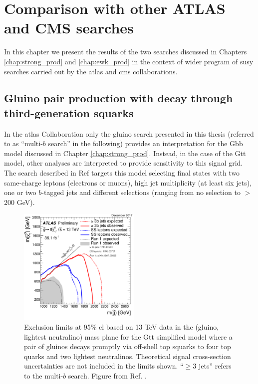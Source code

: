 \chapter{Comparison with other ATLAS and CMS searches}
\label{chap:summary_susy}

In this chapter we present the results of the two searches discussed in Chapters \ref{chap:strong_prod} and \ref{chap:ewk_prod} in the context of
wider program of \gls{susy} searches carried out by the \gls{atlas} and \gls{cms} collaborations. 

\section{Gluino pair production with decay through third-generation squarks}

In the \gls{atlas} Collaboration only the gluino search presented in this thesis (referred to as ``multi-$b$ search'' in the following) 
provides an interpretation for the Gbb model 
discussed in Chapter \ref{chap:strong_prod}.
Instead, in the case of the Gtt model, other analyses 
are interpreted to provide sensitivity  to this 
signal grid. 
The search described in Ref \cite{Aaboud:2017dmy} targets this model selecting final states with two same-charge 
leptons (electrons or muons), high jet multiplicity (at least six jets), one or two $b$-tagged jets and different \met selections 
(ranging from no \met selection to \met $>$ 200 GeV).

\begin{figure}[htbp]
	\centering
	\includegraphics[width=0.52\textwidth]{figures/summary_plots/ATLAS_SUSY_Gtt.pdf}
	\caption{Exclusion limits at 95\% \gls{cl} based on 13 TeV data in the (gluino, lightest neutralino) 
	mass plane for the Gtt simplified model where a pair of gluinos decays promptly via off-shell top 
	squarks to four top quarks and two lightest neutralinos. Theoretical signal cross-section uncertainties are 
	not included in the limits shown. ``$\geq 3$ jets'' refers to the multi-$b$ search. Figure from Ref. \cite{atlasSUSYSummary}.
	} 
	\label{fig:summary_atlas_Gtt}
\end{figure}

